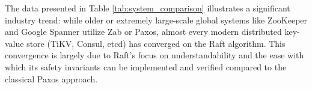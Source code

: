 The data presented in Table \ref{tab:system_comparison} illustrates a significant industry trend: while older or extremely large-scale global systems like ZooKeeper and Google Spanner utilize Zab or Paxos, almost every modern distributed key-value store (TiKV, Consul, etcd) has converged on the Raft algorithm. This convergence is largely due to Raft's focus on understandability and the ease with which its safety invariants can be implemented and verified compared to the classical Paxos approach.